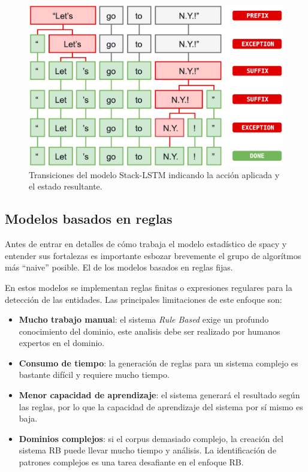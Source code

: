 \documentclass[12pt,a4paper,]{scrartcl}
\providecommand{\tightlist}{%
  \setlength{\itemsep}{0pt}\setlength{\parskip}{0pt}}
\begin{document}
\begin{figure}[H]

{\centering \includegraphics{assets/spacy_tokenization.pdf} 

}

\caption{Transiciones del modelo Stack-LSTM indicando la acción aplicada y el estado resultante.}\label{fig:spacy-tokenization}
\end{figure}

\hypertarget{modelos-basados-en-reglas}{%
\subsection{Modelos basados en reglas}\label{modelos-basados-en-reglas}}

Antes de entrar en detalles de cómo trabaja el modelo estadístico de spacy y entender sus fortalezas es importante esbozar brevemente el grupo de algorítmos más \enquote{naive} posible. El de los modelos basados en reglas fijas.

En estos modelos se implementan reglas finitas o expresiones regulares para la detección de las entidades. Las principales limitaciones de este enfoque son:

\begin{itemize}
\tightlist
\item
  \textbf{Mucho trabajo manua}l: el sistema \emph{Rule Based} exige un profundo conocimiento del dominio, este analisis debe ser realizado por humanos expertos en el dominio.
\item
  \textbf{Consumo de tiempo}: la generación de reglas para un sistema complejo es bastante difícil y requiere mucho tiempo.
\item
  \textbf{Menor capacidad de aprendizaje}: el sistema generará el resultado según las reglas, por lo que la capacidad de aprendizaje del sistema por sí mismo es baja.
\item
  \textbf{Dominios complejos}: si el corpus demasiado complejo, la creación del sistema RB puede llevar mucho tiempo y análisis. La identificación de patrones complejos es una tarea desafiante en el enfoque RB.
\end{itemize}
\end{document}
